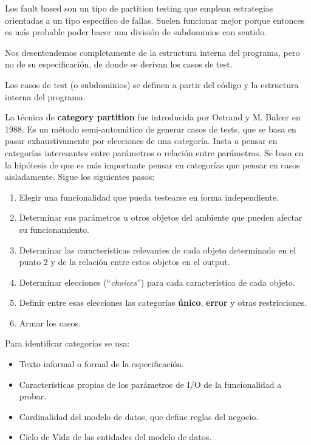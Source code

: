 \documentclass[]{article}
\begin{document}
Los fault based son un tipo de partition testing que emplean estrategias orientadas a un tipo específico de fallas. Suelen funcionar mejor porque entonces es más probable poder hacer una división de subdominios con sentido.

Nos desentendemos completamente de la estructura interna del programa, pero no de su especificación, de donde se derivan los casos de test.

Los casos de test (o subdominios) se definen a partir del código y la estructura interna del programa.

La técnica de \textbf{category partition} fue introducida por Ostrand y M. Balcer en 1988. Es un método semi-automático de generar casos de tests, que se basa en pasar exhaustivamente por elecciones de una categoría. Insta a pensar en categorías interesantes entre parámetros o relación entre parámetros. Se basa en la hipótesis de que es más importante pensar en categorías que pensar en casos aisladamente. Sigue los siguientes pasos:

\begin{enumerate}
	\item Elegir una funcionalidad que pueda testearse en forma independiente.
	\item Determinar sus parámetros u otros objetos del ambiente que pueden afectar su funcionamiento.
	\item Determinar las características relevantes de cada objeto determinado en el punto 2 y de la relación entre estos objetos en el output.
	\item Determinar elecciones (``\textit{choices}'') para cada característica de cada objeto.
	\item Definir entre esas elecciones las categorías \textbf{único}, \textbf{error} y otras restricciones.
	\item Armar los casos.
\end{enumerate}

Para identificar categorías se usa:
\begin{itemize}
	\item Texto informal o formal de la especificación.
	\item Características propias de los parámetros de I/O de la funcionalidad a probar.
	\item Cardinalidad del modelo de datos, que define reglas del negocio.
	\item Ciclo de Vida de las entidades del modelo de datos.
\end{itemize}
\end{document}
